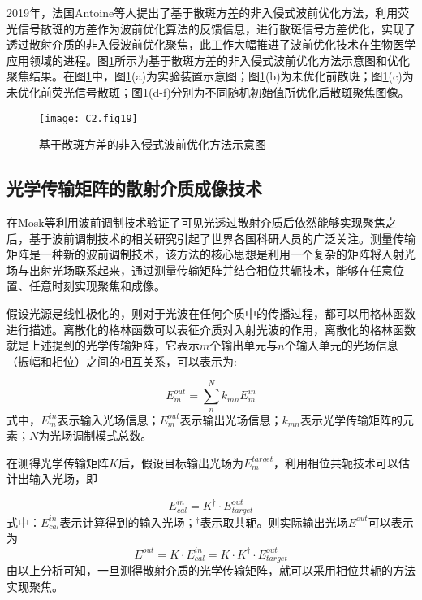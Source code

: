 2019年，法国Antoine等人\cite{boniface_non_invasive_2019}提出了基于散斑方差的非入侵式波前优化方法，利用荧光信号散斑的方差作为波前优化算法的反馈信息，进行散斑信号方差优化，实现了透过散射介质的非入侵波前优化聚焦，此工作大幅推进了波前优化技术在生物医学应用领域的进程。图\ref{fig2:19}所示为基于散斑方差的非入侵式波前优化方法示意图和优化聚焦结果\cite{boniface_non_invasive_2019}。在图\ref{fig2:19}中，图\ref{fig2:19}(a)为实验装置示意图；图\ref{fig2:19}(b)为未优化前散斑；图\ref{fig2:19}(c)为未优化前荧光信号散斑；图\ref{fig2:19}(d-f)分别为不同随机初始值所优化后散斑聚焦图像。

\begin{figure}[htp]
	\centering
	\texttt{[image: C2.fig19]}
	\caption{基于散斑方差的非入侵式波前优化方法示意图}
	\label{fig2:19}
\end{figure}


\subsection{光学传输矩阵的散射介质成像技术}

在Mosk等利用波前调制技术验证了可见光透过散射介质后依然能够实现聚焦之后，基于波前调制技术的相关研究引起了世界各国科研人员的广泛关注。测量传输矩阵是一种新的波前调制技术，该方法的核心思想是利用一个复杂的矩阵将入射光场与出射光场联系起来，通过测量传输矩阵并结合相位共轭技术，能够在任意位置、任意时刻实现聚焦和成像\cite{sheng_introduction_2007}。

假设光源是线性极化的，则对于光波在任何介质中的传播过程，都可以用格林函数进行描述。离散化的格林函数可以表征介质对入射光波的作用，离散化的格林函数就是上述提到的光学传输矩阵，它表示$m$个输出单元与$n$个输入单元的光场信息（振幅和相位）之间的相互关系，可以表示为:

\begin{equation}
    E_{m}^{out}=\sum_{n}^{N}k_{mn}E_{m}^{in}
\label{eq:2.1}
\end{equation}
式中，$E_{m}^{in}$表示输入光场信息；$E_{m}^{out}$表示输出光场信息；$k_{mn}$表示光学传输矩阵的元素；$N$为光场调制模式总数。

在测得光学传输矩阵$K$后，假设目标输出光场为$E_{m}^{target}$，利用相位共轭技术可以估计出输入光场，即

\begin{equation}
    E_{cal}^{in}=K^{\dag} \cdot E_{target}^{out}
\label{eq:2.2}
\end{equation}
式中：$E_{cal}^{in}$表示计算得到的输入光场；$^{\dag}$表示取共轭。则实际输出光场$E^{out}$可以表示为
\begin{equation}
  E^{out}=K \cdot E_{cal}^{in} =K \cdot K^{\dag} \cdot E_{target}^{out}
\label{eq:2.3}
\end{equation}
由以上分析可知，一旦测得散射介质的光学传输矩阵，就可以采用相位共轭的方法实现聚焦。

